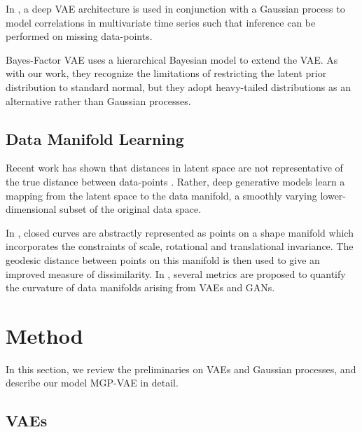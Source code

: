 \documentclass[runningheads]{llncs}
\begin{document}
   In \cite{Fortuin2019MultivariateTS}, a deep VAE architecture is used in conjunction with a Gaussian process to model correlations in multivariate time series such that inference can be performed on missing data-points. \par 
   
   Bayes-Factor VAE \cite{Kim2019BayesFactorVAEHB} uses a hierarchical Bayesian model to extend the VAE. As with our work, they recognize the limitations of restricting the latent prior distribution to standard normal, but they adopt heavy-tailed distributions as an alternative rather than Gaussian processes.

   \subsection{Data Manifold Learning}
   Recent work has shown that distances in latent space are not representative of the true distance between data-points \cite{Arvanitidis2017LatentSO,Khnel2018LatentSN,Shao2017TheRG}. Rather, deep generative models learn a mapping from the latent space to the data manifold, a smoothly varying lower-dimensional subset of the original data space. \par 

   In \cite{shapeAnalysis}, closed curves are abstractly represented as points on a shape manifold which incorporates the constraints of scale, rotational and translational invariance. The geodesic distance between points on this manifold is then used to give an improved measure of dissimilarity.   In \cite{Shukla2019GeometryOD}, several metrics are proposed to quantify the curvature of data manifolds arising from VAEs and GANs. 


   \section{Method}
   In this section, we review the preliminaries on VAEs and Gaussian processes, and describe our model MGP-VAE in detail.

   \subsection{VAEs}
   
\end{document}
